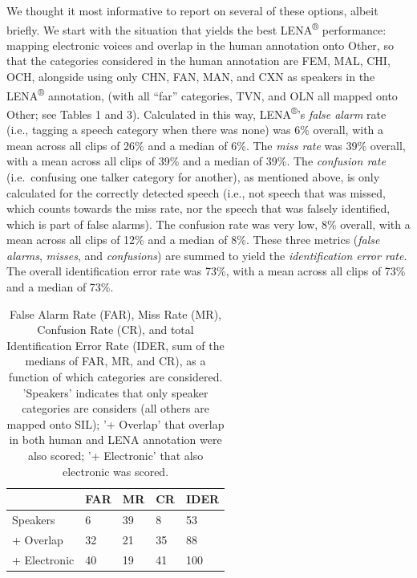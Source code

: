 \documentclass[english,table,man,floatsintext]{apa6}
\begin{document}
We thought it most informative to report on several of these options, albeit briefly. We start with the situation that yields the best LENA\textsuperscript{®} performance: mapping electronic voices and overlap in the human annotation onto Other, so that the categories considered in the human annotation are FEM, MAL, CHI, OCH, alongside using only CHN, FAN, MAN, and CXN as speakers in the LENA\textsuperscript{®} annotation, (with all \enquote{far} categories, TVN, and OLN all mapped onto Other; see Tables 1 and 3).
Calculated in this way, LENA\textsuperscript{®}'s \emph{false alarm} rate (i.e., tagging a speech category when there was none) was 6\% overall, with a mean across all clips of 26\% and a median of 6\%. The \emph{miss rate} was 39\% overall, with a mean across all clips of 39\% and a median of 39\%. The \emph{confusion rate} (i.e.~confusing one talker category for another), as mentioned above, is only calculated for the correctly detected speech (i.e., not speech that was missed, which counts towards the miss rate, nor the speech that was falsely identified, which is part of false alarms). The confusion rate was very low, 8\% overall, with a mean across all clips of 12\% and a median of 8\%. These three metrics (\emph{false alarms}, \emph{misses}, and \emph{confusions}) are summed to yield the \emph{identification error rate}. The overall identification error rate was 73\%, with a mean across all clips of 73\% and a median of 73\%.

\begin{table}[tbp]

\begin{center}
\begin{threeparttable}

\caption{\label{tab:tabalts}False Alarm Rate (FAR), Miss Rate (MR), Confusion Rate (CR), and total Identification Error Rate (IDER, sum of the medians of FAR, MR, and CR), as a function of which categories are considered. 'Speakers' indicates that only speaker categories are considers (all others are mapped onto SIL); '+ Overlap' that overlap in both human and LENA annotation were also scored; '+ Electronic' that also electronic was scored.}

\begin{tabular}{lllll}
\toprule
 & \multicolumn{1}{c}{FAR} & \multicolumn{1}{c}{MR} & \multicolumn{1}{c}{CR} & \multicolumn{1}{c}{IDER}\\
\midrule
Speakers & 6 & 39 & 8 & 53\\
+ Overlap & 32 & 21 & 35 & 88\\
+ Electronic & 40 & 19 & 41 & 100\\
\bottomrule
\end{tabular}

\end{threeparttable}
\end{center}

\end{table}
\end{document}
